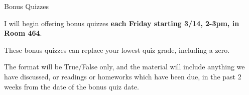 \begin{frame}{Bonus Quizzes}

I will begin offering bonus quizzes \textbf{each Friday starting 3/14, 2-3pm, in Room 464}. 

\vfill 

These bonus quizzes can replace your lowest quiz grade, including a zero. 

\vfill 
The format will be True/False only, and the material will include anything we have discussed, or readings or homeworks which have been due, in the past 2 weeks from the date of the bonus quiz date. 
    
\end{frame}


